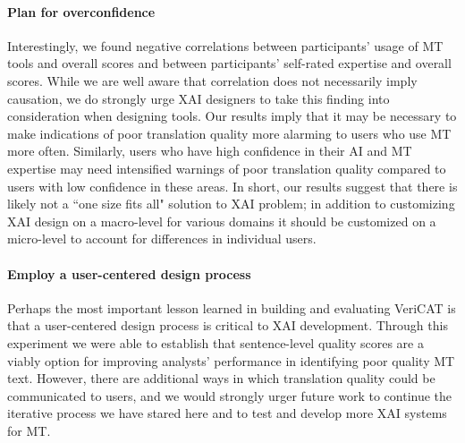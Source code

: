 \paragraph{\textbf{Plan for overconfidence}} Interestingly, we found negative correlations between participants' usage of MT tools and overall scores and between participants' self-rated expertise and overall scores. While we are well aware that correlation does not necessarily imply causation, we do strongly urge XAI designers to take this finding into consideration when designing tools. Our results imply that it may be necessary to make indications of poor translation quality more alarming to users who use MT more often. Similarly, users who have high confidence in their AI and MT expertise may need intensified warnings of poor translation quality compared to users with low confidence in these areas. In short, our results suggest that there is likely not a ``one size fits all" solution to XAI problem; in addition to customizing XAI design on a macro-level for various domains it should be customized on a micro-level to account for differences in individual users.   

\paragraph{\textbf{Employ a user-centered design process}} Perhaps the most important lesson learned in building and evaluating VeriCAT is that a user-centered design process is critical to XAI development. Through this experiment we were able to establish that sentence-level quality scores are a viably option for improving analysts' performance in identifying poor quality MT text. However, there are additional ways in which translation quality could be communicated to users, and we would strongly urger future work to continue the iterative process we have stared here and to test and develop more XAI systems for MT.   


